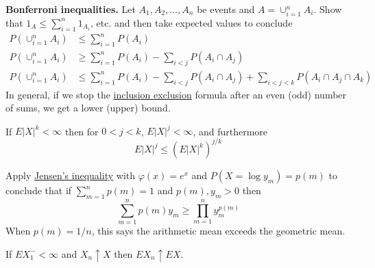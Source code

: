   \begin{exercise}[Durrett 1.6.10]
    \textbf{Bonferroni inequalities.} Let $A_1, A_2, \dots, A_n$ be events and $A = \cup_{i=1}^n A_i$. Show that $1_A \leq \sum_{i=1}^n 1_{A_i}$, etc. and then take expected values to conclude
    \begin{align*}
      P(\cup_{i=1}^n A_i) &\leq \sum_{i=1}^n P(A_i) \\
      P(\cup_{i=1}^n A_i) &\geq \sum_{i=1}^n P(A_i) - \sum_{i<j} P(A_i \cap A_j) \\
      P(\cup_{i=1}^n A_i) &\leq \sum_{i=1}^n P(A_i) - \sum_{i<j} P(A_i \cap A_j) + \sum_{i<j<k} P(A_i \cap A_j \cap A_k)
    \end{align*}
    In general, if we stop the \hyperref[thm:inclusion-exclusion-principle]{inclusion exclusion} formula after an even (odd) number of sums, we get a lower (upper) bound.
  \end{exercise}
  \begin{solution}

  \end{solution}

  \begin{exercise}[Durrett 1.6.11]
    If $E|X|^k < \infty$ then for $0 < j < k$, $E|X|^j < \infty$, and furthermore
    \begin{equation*}
      E|X|^j \leq (E|X|^k)^{j/k}
    \end{equation*}
  \end{exercise}
  \begin{solution}

  \end{solution}

  \begin{exercise}[Durrett 1.6.12]
    Apply \hyperref[thm:jensens-inequality]{Jensen's inequality} with $\varphi(x) = e^x$ and $P(X = \log y_m) = p(m)$ to conclude that if $\sum_{m=1}^n p(m) = 1$ and $p(m), y_m > 0$ then
    \begin{equation*}
      \sum_{m=1}^n p(m) y_m \geq \prod_{m=1}^n y_m^{p(m)}
    \end{equation*}
    When $p(m) = 1/n$, this says the arithmetic mean exceeds the geometric mean.
  \end{exercise}
  \begin{solution}

  \end{solution}

  \begin{exercise}[Durrett 1.6.13]
    If $EX_1^- < \infty$ and $X_n \uparrow X$ then $EX_n \uparrow EX$.
  \end{exercise}
  \begin{solution}

  \end{solution}

